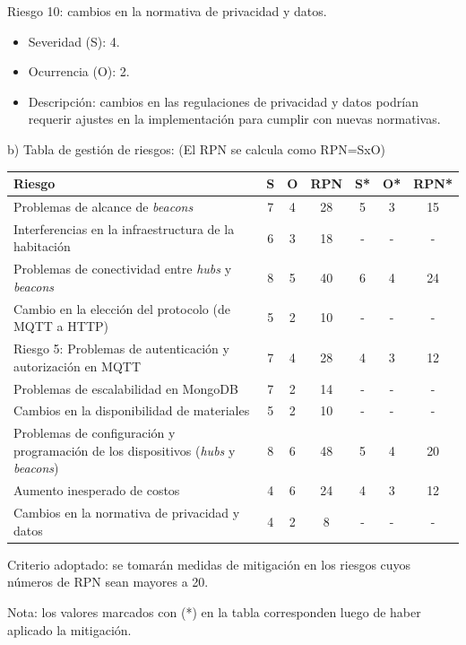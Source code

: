 \documentclass[
11pt, %
]{charter}
\begin{document}
Riesgo 10: cambios en la normativa de privacidad y datos.
\begin{itemize}
	\item Severidad (S): 4.
	\item Ocurrencia (O): 2.
	\item Descripción: cambios en las regulaciones de privacidad y datos podrían requerir ajustes en la implementación para cumplir con nuevas normativas.
\end{itemize}

b) Tabla de gestión de riesgos:      (El RPN se calcula como RPN=SxO)

\begin{table}[htpb]
\centering
\begin{tabularx}{\linewidth}{@{}|X|c|c|c|c|c|c|@{}}
\hline
\rowcolor[HTML]{C0C0C0} 
Riesgo & S & O & RPN & S* & O* & RPN* \\ \hline
Problemas de alcance de \textit{beacons} & 7 & 4 & 28 & 5 & 3 & 15     \\ \hline
Interferencias en la infraestructura de la habitación & 6 & 3 & 18 & - & - & -      \\ \hline
Problemas de conectividad entre \textit{hubs} y \textit{beacons} & 8 & 5 & 40 & 6 & 4 & 24      \\ \hline
Cambio en la elección del protocolo (de MQTT a HTTP) & 5 & 2 & 10 & - & - & -      \\ \hline
Riesgo 5: Problemas de autenticación y autorización en MQTT & 7 & 4 & 28 & 4 & 3 & 12      \\ \hline
Problemas de escalabilidad en MongoDB&  7 &  2 &  14   &   - & - & -       \\ \hline
Cambios en la disponibilidad de materiales& 5  & 2  &   10  &  - & - & -       \\ \hline
Problemas de configuración y programación de los dispositivos (\textit{hubs} y \textit{beacons})& 8  & 6  &    48 & 5 & 4 & 20      \\ \hline
Aumento inesperado de costos       & 4  &  6 &  24   &  4  & 3   &   12   \\ \hline
Cambios en la normativa de privacidad y datos       & 4  &  2 &   8  &  - & - & -       \\ \hline
\end{tabularx}%
\end{table}

Criterio adoptado: 
se tomarán medidas de mitigación en los riesgos cuyos números de RPN sean mayores a 20.

Nota: los valores marcados con (*) en la tabla corresponden luego de haber aplicado la mitigación.
\end{document}
